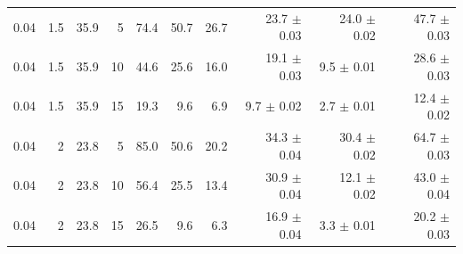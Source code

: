 \begin{table}[H]
\begin{tabular}{rrrrrrrrrr}
0.04 & 1.5 & 35.9 & 5 & 74.4 & 50.7 & 26.7 & 23.7 $\pm$ 0.03 & 24.0 $\pm$ 0.02 & 47.7 $\pm$ 0.03 \\
0.04 & 1.5 & 35.9 & 10 & 44.6 & 25.6 & 16.0 & 19.1 $\pm$ 0.03 & 9.5 $\pm$ 0.01 & 28.6 $\pm$ 0.03 \\
0.04 & 1.5 & 35.9 & 15 & 19.3 & 9.6 & 6.9 & 9.7 $\pm$ 0.02 & 2.7 $\pm$ 0.01 & 12.4 $\pm$ 0.02 \\
0.04 & 2 & 23.8 & 5 & 85.0 & 50.6 & 20.2 & 34.3 $\pm$ 0.04 & 30.4 $\pm$ 0.02 & 64.7 $\pm$ 0.03 \\
0.04 & 2 & 23.8 & 10 & 56.4 & 25.5 & 13.4 & 30.9 $\pm$ 0.04 & 12.1 $\pm$ 0.02 & 43.0 $\pm$ 0.04 \\
0.04 & 2 & 23.8 & 15 & 26.5 & 9.6 & 6.3 & 16.9 $\pm$ 0.04 & 3.3 $\pm$ 0.01 & 20.2 $\pm$ 0.03 \\
\bottomrule
\end{tabular}
\end{table}
